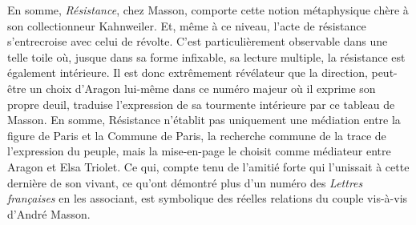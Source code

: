 	En somme, \emph{Résistance}, chez Masson, comporte cette notion métaphysique chère à son collectionneur Kahnweiler. Et, même à ce niveau, l’acte de résistance s’entrecroise avec celui de révolte. C’est particulièrement observable dans une telle toile où, jusque dans sa forme infixable, sa lecture multiple, la résistance est également intérieure. Il est donc extrêmement révélateur que la direction, peut-être un choix d’Aragon lui-même dans ce numéro majeur où il exprime son propre deuil, traduise l’expression de sa tourmente intérieure par ce tableau de Masson. En somme, Résistance n’établit pas uniquement une médiation entre la figure de Paris et la Commune de Paris, la recherche commune de la trace de l’expression du peuple, mais la mise-en-page le choisit comme médiateur entre Aragon et Elsa Triolet. Ce qui, compte tenu de l’amitié forte qui l’unissait à cette dernière de son vivant, ce qu’ont démontré plus d’un numéro des \emph{Lettres françaises} en les associant, est symbolique des réelles relations du couple vis-à-vis d'André Masson. 